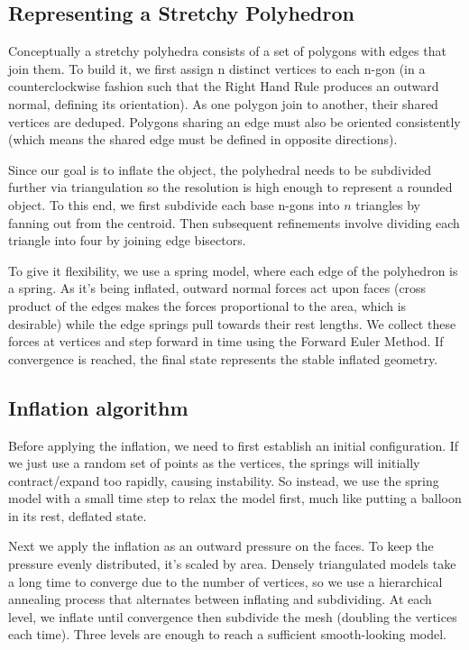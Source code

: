 \documentclass[letterpaper,11pt]{article}
\begin{document}
\subsection*{Representing a Stretchy Polyhedron}

Conceptually a stretchy polyhedra consists of a set of polygons with edges that join them. To build it, we first assign n distinct vertices to each n-gon (in a counterclockwise fashion such that the Right Hand Rule produces an outward normal, defining its orientation). As one polygon join to another, their shared vertices are deduped. Polygons sharing an edge must also be oriented consistently (which means the shared edge must be defined in opposite directions).

Since our goal is to inflate the object, the polyhedral needs to be subdivided further via triangulation so the resolution is high enough to represent a rounded object. To this end, we first subdivide each base n-gons into $n$ triangles by fanning out from the centroid. Then subsequent refinements involve dividing each triangle into four by joining edge bisectors.

To give it flexibility, we use a spring model, where each edge of the polyhedron is a spring. As it's being inflated, outward normal forces act upon faces (cross product of the edges makes the forces proportional to the area, which is desirable) while the edge springs pull towards their rest lengths. We collect these forces at vertices and step forward in time using the Forward Euler Method. If convergence is reached, the final state represents the stable inflated geometry.

\subsection*{Inflation algorithm}

Before applying the inflation, we need to first establish an initial configuration. If we just use a random set of points as the vertices, the springs will initially contract/expand too rapidly, causing instability. So instead, we use the spring model with a small time step to relax the model first, much like putting a balloon in its rest, deflated state.

Next we apply the inflation as an outward pressure on the faces. To keep the pressure evenly distributed, it's scaled by area. Densely triangulated models take a long time to converge due to the number of vertices, so we use a hierarchical annealing process that alternates between inflating and subdividing. At each level, we inflate until convergence then subdivide the mesh (doubling the vertices each time). Three levels are enough to reach a sufficient smooth-looking model.
\end{document}
